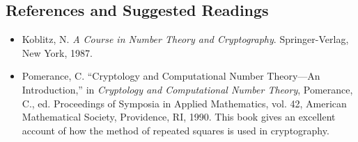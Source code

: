  
\subsection*{References and Suggested Readings}
 
 
{\small
\begin{itemize}
 
\item[{\bf [1]}]%
Koblitz, N. {\it A Course in Number Theory and Cryptography}.
Springer-Verlag, New York, 1987.  
 
 
\item[{\bf [2]}]
Pomerance, C. ``Cryptology and Computational Number Theory---An
Introduction,'' in {\it Cryptology and Computational Number Theory},
Pomerance, C., ed. Proceedings of Symposia in Applied Mathematics,
vol. 42, American Mathematical Society, Providence, RI, 1990.  This
book gives an excellent account of how the method of repeated squares
is used in cryptography. 
 
\end{itemize}
}
 
 
 
